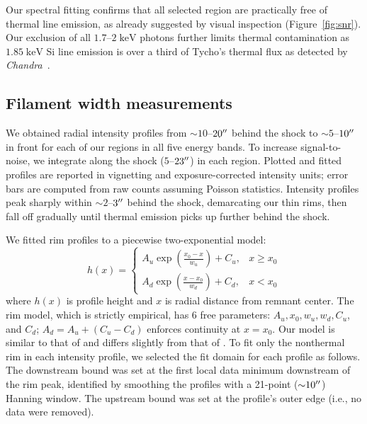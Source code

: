 \documentclass[iop, apj, numberedappendix]{emulateapj}
\newcommand*{\mt}{\mathrm}
\newcommand*{\unit}[1]{\;\mt{#1}}  %
\newcommand*{\abt}{\mathord{\sim}} %
\newcommand*{\Chandra}{\textit{Chandra}\ }
\begin{document}
Our spectral fitting confirms that all selected region are practically free of
thermal line emission, as already suggested by visual inspection
(Figure~\ref{fig:snr}).  Our exclusion of all $1.7$--$2 \unit{keV}$ photons
further limits thermal contamination as $1.85 \unit{keV}$ Si line emission is
over a third of Tycho's thermal flux as detected by \Chandra \citep{hwang2002}.

\subsection{Filament width measurements}
\label{sec:fwhms}

We obtained radial intensity profiles from $\abt 10$--$20\mbox{$^{\prime\prime}$}$ behind the
shock to $\abt 5$--$10\mbox{$^{\prime\prime}$}$ in front for each of our regions in all five
energy bands.  To increase signal-to-noise, we integrate along the shock
($5$--$23\mbox{$^{\prime\prime}$}$) in each region.  Plotted and fitted profiles are reported in
vignetting and exposure-corrected intensity units; error bars are computed from
raw counts assuming Poisson statistics.  Intensity profiles peak sharply
within $\abt 2$--$3\mbox{$^{\prime\prime}$}$ behind the shock, demarcating our thin rims,
then fall off gradually until thermal emission picks up further behind the
shock.

We fitted rim profiles to a piecewise two-exponential model:
\begin{equation} \label{eq:prof}
    h(x) =
    \begin{cases}
        A_u \exp \left(\frac{x_0 - x}{w_u}\right) + C_u, &x \geq x_0 \\
        A_d \exp \left(\frac{x - x_0}{w_d}\right) + C_d, &x < x_0
    \end{cases}
\end{equation}
where $h(x)$ is profile height and $x$ is radial distance from remnant center.
The rim model, which is strictly empirical, has 6 free parameters:
$A_u, x_0, w_u, w_d, C_u$, and $C_d$; $A_d = A_u + (C_u - C_d)$ enforces
continuity at $x=x_0$. Our model is similar to that of \citet{bamba2003,
bamba2005-hist} and differs slightly from that of .
To fit only the nonthermal rim in each intensity profile, we selected the fit
domain for each profile as follows.  The downstream bound was set at the first
local data minimum downstream of the rim peak, identified by smoothing the
profiles with a 21-point ($\abt 10\arcsec$) Hanning window.  The upstream bound
was set at the profile's outer edge (i.e., no data were removed).
\end{document}
